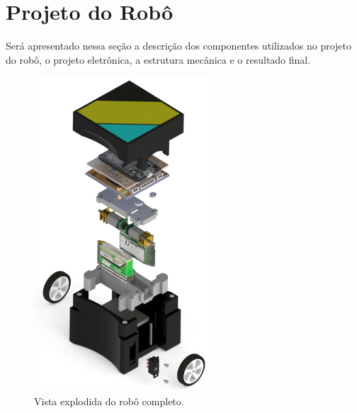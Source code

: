 \section{Projeto do Robô}
Será apresentado nessa seção a descrição dos componentes utilizados no projeto do robô, o projeto eletrônica, a estrutura mecânica e o resultado final.






\begin{figure}[H]
    \centering
    \includegraphics[width=0.6\textwidth]{figuras/robo/robo_completo_explodido.png}
    \caption{Vista explodida do robô completo.}
    \label{fig:robo_completo_explodido}
\end{figure}